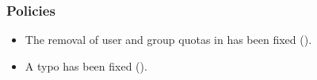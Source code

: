 \subsubsection{Policies}
\begin{itemize}

\item The removal of user and group quotas in 
has been fixed ().

\item A typo has been fixed ().

\end{itemize}






